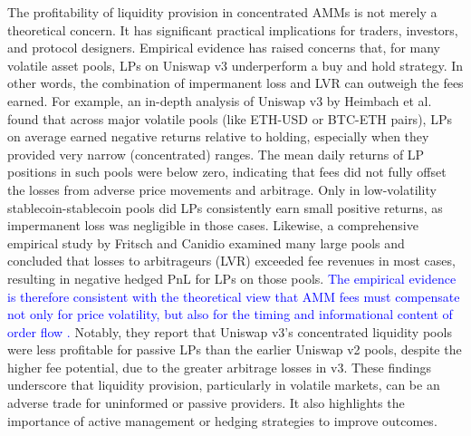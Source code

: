 \documentclass[11pt]{article}
\begin{document}
The profitability of liquidity provision in concentrated AMMs is not merely a theoretical concern. It has significant 
practical implications for traders, investors, and protocol designers. Empirical evidence has raised concerns that, for 
many volatile asset pools, LPs on Uniswap v3 underperform a buy and hold strategy. In other words, the combination of 
impermanent loss and LVR can outweigh the fees earned. For example, an in-depth analysis of Uniswap v3 by Heimbach et 
al. \cite{heimbach2022} found that across major volatile pools (like ETH-USD or BTC-ETH pairs), LPs on average earned 
negative returns relative to holding, especially when they provided very narrow (concentrated) ranges. The mean daily 
returns of LP positions in such pools were below zero, indicating that fees did not fully offset the losses from adverse 
price movements and arbitrage. Only in low-volatility stablecoin-stablecoin pools did LPs consistently earn small 
positive returns, as impermanent loss was negligible in those cases. Likewise, a comprehensive empirical study by 
Fritsch and Canidio \cite{fritsch2024} examined many large pools and concluded that losses to arbitrageurs (LVR) 
exceeded fee revenues in most cases, resulting in negative hedged PnL for LPs on those pools. \textcolor{blue}{The empirical evidence is
therefore consistent with the theoretical view that AMM fees must compensate not only for price volatility, but also for the
timing and informational content of order flow \cite{milionis2023,fritsch2024,maire2024}.} Notably, they report
that Uniswap v3’s concentrated liquidity pools were less profitable for passive LPs than the earlier Uniswap v2 
pools, despite the higher fee potential, due to the greater arbitrage losses in v3. These findings underscore that 
liquidity provision, particularly in volatile markets, can be an adverse trade for uninformed or passive providers. 
It also highlights the importance of active management or hedging strategies to improve outcomes.
\end{document}
